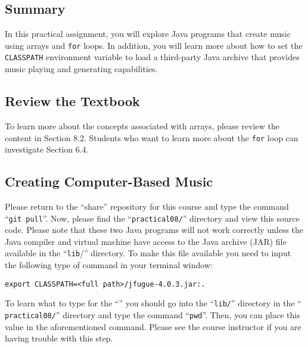 



\subsection*{Summary}
\vspace*{-.05in}

In this practical assignment, you will explore Java programs that create music using arrays and {\tt for} loops. In
addition, you will learn more about how to set the {\tt CLASSPATH} environment variable to load a third-party Java
archive that provides music playing and generating capabilities.

\vspace*{-.1in}
\subsection*{Review the Textbook}
\vspace*{-.05in}

To learn more about the concepts associated with arrays, please review the content in Section 8.2. Students who want to
learn more about the {\tt for} loop can investigate Section 6.4.

\vspace*{-.1in}
\subsection*{Creating Computer-Based Music}
\vspace*{-.05in}

Please return to the ``share'' repository for this course and type the command ``{\tt git pull}''. Now, please find the
``{\tt practical08/}'' directory and view this source code. Please note that these two Java programs will not work
correctly unless the Java compiler and virtual machine have access to the Java archive (JAR) file available in the
``{\tt lib}/'' directory. To make this file available you need to input the following type of command in your terminal
window: 

  {\tt export CLASSPATH=<full path>/jfugue-4.0.3.jar:.}

  To learn what to type for the ``{\tt <full path>}'' you should go into the ``{\tt lib/}'' directory in the ``{\tt
practical08/}'' directory and type the command ``{\tt pwd}''.  Then, you can place this value in the aforementioned
command. Please see the course instructor if you are having trouble with this step.

